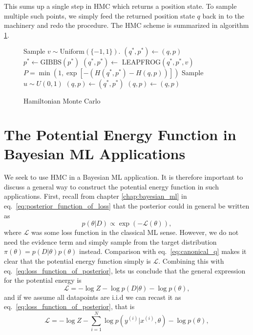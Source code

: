 This sums up a single step in HMC which returns a position state. To sample multiple such points, we simply feed the returned position state $q$ back in to the machinery 
and redo the procedure.
The HMC scheme is summarized in algorithm \ref{algo:hmc}.
\begin{figure}[H]
	\begin{algorithm}[H]
		\caption{Hamiltonian Monte Carlo}\label{algo:hmc}
		\begin{algorithmic}
      \State Sample $v \sim \text{Uniform}(\{-1, 1\})$.
      \State $(q^*, p^*) \leftarrow (q, p)$    
      \State $p^* \leftarrow \text{GIBBS}(p^*)$
       
        \State $(q^*, p^*) \leftarrow$ LEAPFROG$(q^*, p^*, v)$
      \EndFor
      \State $P = \min \left(1, \exp\left[-\left(H(q^*,p^*) - H(q, p)\right)\right]\right)$
      \State Sample $u \sim U(0,1)$ 
        \State $(q, p) \gets (q^*, p^*)$ 
      \Else
        \State $(q, p) \gets (q, p)$ 
      \EndIf
      \EndProcedure
		\end{algorithmic}
	\end{algorithm}
\end{figure}

\section{The Potential Energy Function in Bayesian ML Applications}
We seek to use HMC in a Bayesian ML application. It is therefore important to
discuss a general way to construct the potential energy function in such applications.
First, recall from chapter \ref{chap:bayesian_ml} in eq.~\eqref{eq:posterior_function_of_loss} that the posterior could in general be written as
\begin{equation}
  p(\theta|D) \propto \exp\left(-\mathcal{L}(\theta)\right),
\end{equation}
where $\mathcal{L}$ was some loss function in the classical ML sense.
However, we do not need the evidence term and simply sample from the target distribution $\pi(\theta) = p(D|\theta)p(\theta)$ instead.
Comparison with eq.~\eqref{eq:canonical_q} makes it clear that the potential energy
function simply is $\mathcal{L}$. Combining this with eq.~\eqref{eq:loss_function_of_posterior}, lets us conclude that the general expression
for the potential energy is
\begin{equation}
  \mathcal{L} = -\log Z - \log p(D|\theta) - \log p(\theta),
\end{equation}
and if we assume all datapoints are i.i.d we can recast it as eq.~\eqref{eq:loss_function_of_posterior}, that is
\begin{equation}
  \mathcal{L} = -\log Z - \sum_{i=1}^N \log p(y^{(i)}|x^{(i)}, \theta) - \log p(\theta),
\end{equation}

